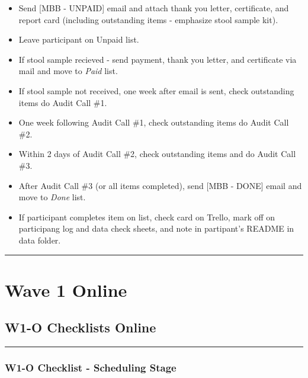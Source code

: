 \documentclass[
]{book}
\providecommand{\tightlist}{%
  \setlength{\itemsep}{0pt}\setlength{\parskip}{0pt}}
\begin{document}
\begin{itemize}
\tightlist
\item
  Send {[}MBB - UNPAID{]} email and attach thank you letter, certificate, and report card (including outstanding items - emphasize stool sample kit).
\item
  Leave participant on Unpaid list.
\item
  If stool sample recieved - send payment, thank you letter, and certificate via mail and move to \emph{Paid} list.
\item
  If stool sample not received, one week after email is sent, check outstanding items do Audit Call \#1.
\item
  One week following Audit Call \#1, check outstanding items do Audit Call \#2.
\item
  Within 2 days of Audit Call \#2, check outstanding items and do Audit Call \#3.
\item
  After Audit Call \#3 (or all items completed), send {[}MBB - DONE{]} email and move to \emph{Done} list.
\item
  If participant completes item on list, check card on Trello, mark off on participang log and data check sheets, and note in partipant's README in data folder.
\end{itemize}

\begin{center}\rule{0.5\linewidth}{0.5pt}\end{center}

\hypertarget{wave-1-online}{%
\chapter{Wave 1 Online}\label{wave-1-online}}

\hypertarget{w1-o-checklists-online}{%
\section{W1-O Checklists Online}\label{w1-o-checklists-online}}

\begin{center}\rule{0.5\linewidth}{0.5pt}\end{center}

\hypertarget{w1-o-checklist---scheduling-stage}{%
\subsection{W1-O Checklist - Scheduling Stage}\label{w1-o-checklist---scheduling-stage}}
\end{document}
